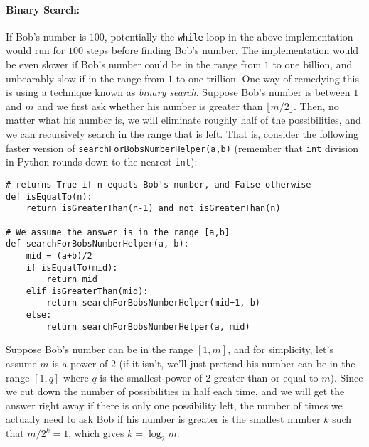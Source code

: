 \documentclass[11pt]{article}
\def\floor#1{\lfloor #1 \rfloor}
\begin{document}
\paragraph{\Large Binary Search:}

If Bob's number is $100$, potentially the \texttt{while} loop in the
above implementation would run for $100$ steps before finding Bob's
number.  The implementation would be even slower if Bob's number could
be in the range from $1$ to one billion, and unbearably slow if in the
range from $1$ to one trillion.  One way of remedying this is
using a technique known as {\em binary search}.  Suppose Bob's number
is between $1$ and $m$ and we first ask whether his number is greater
than $\floor{m/2}$.  Then, no matter what his number is, we will
eliminate roughly half of the possibilities, and we can recursively
search in the range that is left.  
That is, consider the following
faster version of \texttt{searchForBobsNumberHelper(a,b)} (remember
that \texttt{int} division in Python rounds down to the nearest
\texttt{int}):

\begin{verbatim}
# returns True if n equals Bob's number, and False otherwise
def isEqualTo(n):
    return isGreaterThan(n-1) and not isGreaterThan(n)

# We assume the answer is in the range [a,b]
def searchForBobsNumberHelper(a, b):
    mid = (a+b)/2
    if isEqualTo(mid):
        return mid
    elif isGreaterThan(mid):
        return searchForBobsNumberHelper(mid+1, b)
    else:
        return searchForBobsNumberHelper(a, mid)
\end{verbatim}

Suppose Bob's number can be in the range $[1,m]$, and for simplicity,
let's assume $m$ is a power of $2$ (if it isn't, we'll just pretend
his number can be in the range $[1,q]$ where $q$ is the smallest power
of $2$ greater than or equal to $m$).  Since we cut down
the number of possibilities in half each time, and
we will get the answer right away if there is only one possibility
left, the number of times we actually need to ask Bob if his number is
greater is the smallest number $k$ such that $m/2^k = 1$, which gives
$k = \log_2 m$.  
\end{document}
